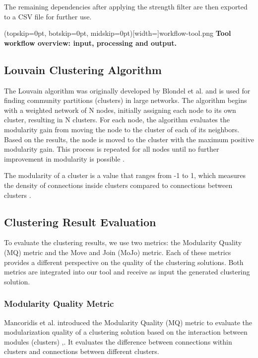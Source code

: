 \documentclass{ieeeaccess}
\begin{document}
The remaining dependencies after applying the strength filter are then exported to a CSV file for further use.

\Figure[t!](topskip=0pt, botskip=0pt, midskip=0pt)[width=\textwidth]{workflow-tool.png}
{ \textbf{Tool workflow overview: input, processing and output.}\label{fig:tool}}

\subsection{Louvain Clustering Algorithm}
\label{subsec:louvain}

The Louvain algorithm was originally developed by Blondel et al. and is used for finding community partitions (clusters) in large networks. The algorithm begins with a weighted network of N nodes, initially assigning each node to its own cluster, resulting in N clusters. For each node, the algorithm evaluates the modularity gain from moving the node to the cluster of each of its neighbors. Based on the results, the node is moved to the cluster with the maximum positive modularity gain. This process is repeated for all nodes until no further improvement in modularity is possible \cite{b8}.

The modularity of a cluster is a value that ranges from -1 to 1, which measures the density of connections inside clusters compared to connections between clusters \cite{b9}.

\subsection{Clustering Result Evaluation}
\label{subsec:evaluation_def}

To evaluate the clustering results, we use two metrics: the Modularity Quality (MQ) metric and the Move and Join (MoJo) metric. Each of these metrics provides a different perspective on the quality of the clustering solutions. Both metrics are integrated into our tool and receive as input the generated clustering solution.

\subsubsection{Modularity Quality Metric}

Mancoridis et al. introduced the Modularity Quality (MQ) metric to evaluate the modularization quality of a clustering solution based on the interaction between modules (clusters) \cite{b2},\cite{b10}. It evaluates the difference between connections within clusters and connections between different clusters.
\end{document}
